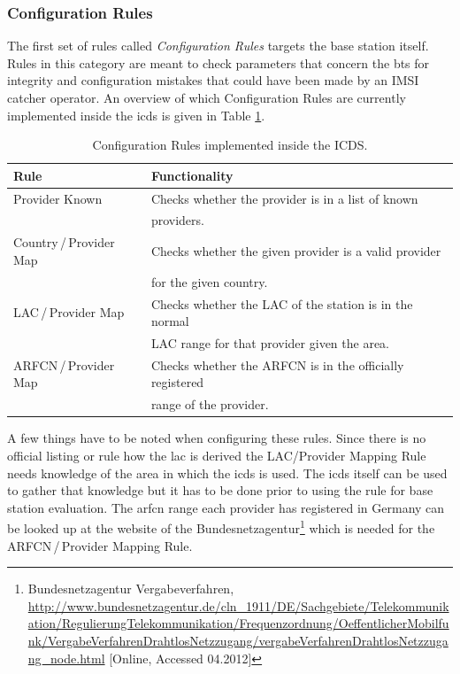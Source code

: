 \subsubsection{Configuration Rules}
The first set of rules called \emph{Configuration Rules} targets the base station itself.
Rules in this category are meant to check parameters that concern the \gls{bts} for integrity and configuration mistakes that could have been made by an IMSI catcher operator.
An overview of which Configuration Rules are currently implemented inside the \gls{icds} is given in Table \ref{tab:config_rules}.
\begin{table}
\centering
\begin{tabular}{ll}
\toprule
Rule					&Functionality\\
\midrule
Provider Known			&Checks whether the provider is in a list of known \\
						&providers.\\
Country\,/\,Provider Map	&Checks whether the given provider is a valid provider\\
						&for the given country.\\
LAC\,/\,Provider Map		&Checks whether the LAC of the station is in the normal\\
						&LAC range for that provider given the area.\\
ARFCN\,/\,Provider Map		&Checks whether the ARFCN is in the officially registered\\
						&range of the provider.\\
\bottomrule
\end{tabular}
\caption{Configuration Rules implemented inside the ICDS.}
\label{tab:config_rules}
\end{table}

A few things have to be noted when configuring these rules.
Since there is no official listing or rule how the \gls{lac} is derived the LAC/Provider Mapping Rule needs knowledge of the area in which the \gls{icds} is used.
The \gls{icds} itself can be used to gather that knowledge but it has to be done prior to using the rule for base station evaluation. 
The \gls{arfcn} range each provider has registered in Germany can be looked up at the website of the Bundesnetzagentur\footnote{Bundesnetzagentur Vergabeverfahren, \url{http://www.bundesnetzagentur.de/cln_1911/DE/Sachgebiete/Telekommunikation/RegulierungTelekommunikation/Frequenzordnung/OeffentlicherMobilfunk/VergabeVerfahrenDrahtlosNetzzugang/vergabeVerfahrenDrahtlosNetzzugang_node.html} [Online, Accessed 04.2012]} which is needed for the ARFCN\,/\,Provider Mapping Rule.

